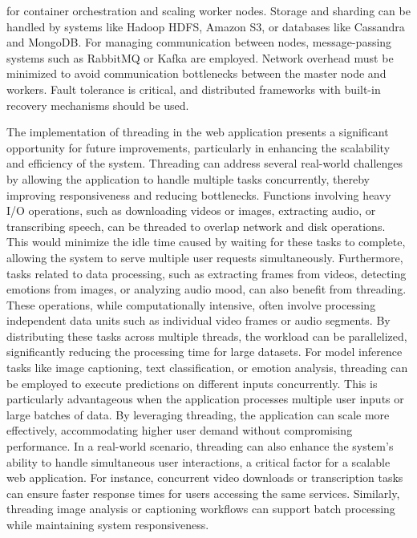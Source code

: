 for container orchestration and scaling worker nodes. Storage and sharding can be handled by systems like Hadoop HDFS, Amazon S3, or databases like Cassandra and MongoDB. For managing communication between nodes, message-passing systems such as RabbitMQ or Kafka are employed. Network overhead must be minimized to avoid communication bottlenecks between the master node and workers. Fault tolerance is critical, and distributed frameworks with built-in recovery mechanisms should be used.

\vspace{1em}

\noindent
The implementation of threading in the web application presents a significant opportunity for future improvements, particularly in enhancing the scalability and efficiency of the system. Threading can address several real-world challenges by allowing the application to handle multiple tasks concurrently, thereby improving responsiveness and reducing bottlenecks. Functions involving heavy I/O operations, such as downloading videos or images, extracting audio, or transcribing speech, can be threaded to overlap network and disk operations. This would minimize the idle time caused by waiting for these tasks to complete, allowing the system to serve multiple user requests simultaneously. Furthermore, tasks related to data processing, such as extracting frames from videos, detecting emotions from images, or analyzing audio mood, can also benefit from threading. These operations, while computationally intensive, often involve processing independent data units such as individual video frames or audio segments. By distributing these tasks across multiple threads, the workload can be parallelized, significantly reducing the processing time for large datasets. For model inference tasks like image captioning, text classification, or emotion analysis, threading can be employed to execute predictions on different inputs concurrently. This is particularly advantageous when the application processes multiple user inputs or large batches of data. By leveraging threading, the application can scale more effectively, accommodating higher user demand without compromising performance. In a real-world scenario, threading can also enhance the system's ability to handle simultaneous user interactions, a critical factor for a scalable web application. For instance, concurrent video downloads or transcription tasks can ensure faster response times for users accessing the same services. Similarly, threading image analysis or captioning workflows can support batch processing while maintaining system responsiveness. 


\pagebreak
